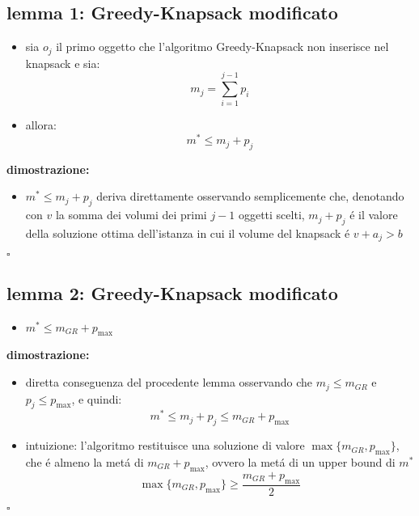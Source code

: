 \subsection*{lemma 1: Greedy-Knapsack modificato}
\begin{flushleft}
	\begin{itemize}
		\item sia $o_j$ il primo oggetto che l'algoritmo Greedy-Knapsack non inserisce nel knapsack e sia:
			$$m_j=\sum_{i=1}^{j-1}p_i$$
		\item allora:
			$$m^*\leq m_j+p_j$$
	\end{itemize}
	\vspace{0.5cm}
	\textbf{dimostrazione:}
	\begin{itemize}
		\item $m^*\leq m_j+p_j$ deriva direttamente osservando semplicemente che, denotando con $v$ la somma dei volumi dei primi $j-1$ oggetti scelti, $m_j+p_j$ \'e il valore della soluzione ottima dell'istanza in cui il volume del knapsack \'e $v+a_j>b$
	\end{itemize}
	\hfill$\square$
\end{flushleft}


\subsection*{lemma 2: Greedy-Knapsack modificato}
\begin{flushleft}
	\begin{itemize}
		\item $m^*\leq m_{GR}+p_{\max}$
	\end{itemize}
	\vspace{0.5cm}
	\textbf{dimostrazione:}
	\begin{itemize}
		\item diretta conseguenza del procedente lemma osservando che $m_j\leq m_{GR}$ e $p_j\leq p_{\max}$, e quindi:
			$$m^*\leq m_j+p_j\leq m_{GR}+p_{\max}$$
		\item intuizione: l'algoritmo restituisce una soluzione di valore $\max\{m_{GR},p_{\max}\}$, che \'e almeno la met\'a di $m_{GR}+p_{\max}$, ovvero la met\'a di un upper bound di $m^*$
			$$\max\{m_{GR},p_{\max}\}\geq\frac{m_{GR}+p_{\max}}{2}$$
	\end{itemize}
	\hfill$\square$
\end{flushleft}


